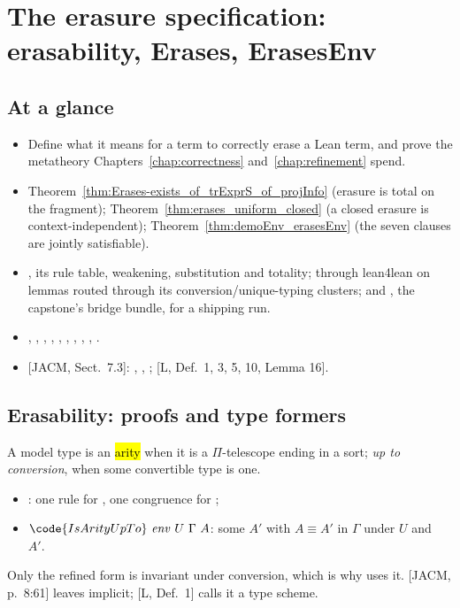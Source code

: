 \chapter{The erasure specification: erasability, Erases, ErasesEnv}
\label{chap:erases}

\section*{At a glance}
\begin{itemize}
\item {} Define what it means for a \lbox{} term to correctly erase a Lean term, and prove the metatheory Chapters~\ref{chap:correctness} and~\ref{chap:refinement} spend.
\item {} Theorem~\ref{thm:Erases-exists_of_trExprS_of_projInfo} (erasure is total on the fragment); Theorem~\ref{thm:erases_uniform_closed} (a closed erasure is context-independent); Theorem~\ref{thm:demoEnv_erasesEnv} (the seven \ErasesEnv{} clauses are jointly satisfiable).
\item {} \stProved{} \Erases{}, its rule table, weakening, substitution and totality; \stInherited{} through lean4lean on lemmas routed through its conversion/unique-typing clusters; \stOpen{} \ErasesEnv{} and \LowerEnv{}, the capstone's bridge bundle, for a shipping run.
\item {} , , , , , , , , , .
\item {} [JACM, Sect.\ 7.3]: , , ; [L, Def.\ 1, 3, 5, 10, Lemma 16].
\end{itemize}

\section{Erasability: proofs and type formers}
\label{sec:erases:erasability}

\begin{definition}[Arities]
\label{def:IsArity}
\leanok
{}
 A model type is an \hl{arity} when it is a $\Pi$-telescope ending in a sort; \emph{up to conversion}, when some convertible type is one.
\begin{itemize}
\item {}: one rule for , one congruence for ;
\item $\code{IsArityUpTo}\ \mathit{env}\ U\ \Gamma\ A$: some $A'$ with $A \equiv A'$ in $\Gamma$ under $U$ and \ $A'$.
\end{itemize}
 Only the refined form is invariant under conversion, which is why  uses it. [JACM, p.\ 8:61] leaves  implicit; [L, Def.\ 1] calls it a type scheme.
\end{definition}

